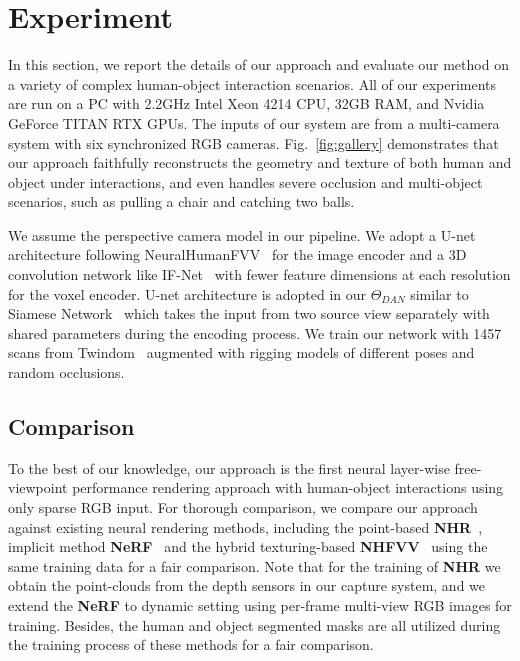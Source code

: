 \section{Experiment}
In this section, we report the details of our approach and evaluate our method on a variety of complex human-object interaction scenarios. 
%
All of our experiments are run on a PC with 2.2GHz Intel Xeon 4214 CPU, 32GB RAM, and Nvidia GeForce TITAN RTX GPUs. 
%
The inputs of our system are from a multi-camera system with six synchronized RGB cameras. 
%
Fig.~\ref{fig:gallery} demonstrates that our approach faithfully reconstructs the geometry and texture of both human and object under interactions, and even handles severe occlusion and multi-object scenarios, such as pulling a chair and catching two balls.

We assume the perspective camera model in our pipeline. 
%
We adopt a U-net architecture following NeuralHumanFVV~\cite{NeuralHumanFVV2021CVPR} for the image encoder and a 3D convolution network like IF-Net~\cite{chibane2020implicit} with fewer feature dimensions at each resolution for the voxel encoder. 
%
U-net architecture is adopted in our $\Theta_{DAN}$ similar to Siamese Network~\cite{koch2015siamese} which takes the input from two source view separately with shared parameters during the encoding process.
%
We train our network with 1457 scans from Twindom~\cite{Twindom} augmented with rigging models of different poses and random occlusions.

\subsection{Comparison}
To the best of our knowledge, our approach is the first neural layer-wise free-viewpoint performance rendering approach with human-object interactions using only sparse RGB input.
%
For thorough comparison, we compare our approach against existing neural rendering methods, including the point-based \textbf{NHR}~\cite{Wu_2020_CVPR}, implicit method \textbf{NeRF}~\cite{nerf} and the hybrid texturing-based \textbf{NHFVV}~\cite{NeuralHumanFVV2021CVPR} using the same training data for a fair comparison.
%
Note that for the training of \textbf{NHR} we obtain the point-clouds from the depth sensors in our capture system, and we extend the \textbf{NeRF} to dynamic setting using per-frame multi-view RGB images for training.
%
Besides, the human and object segmented masks are all utilized during the training process of these methods for a fair comparison.

